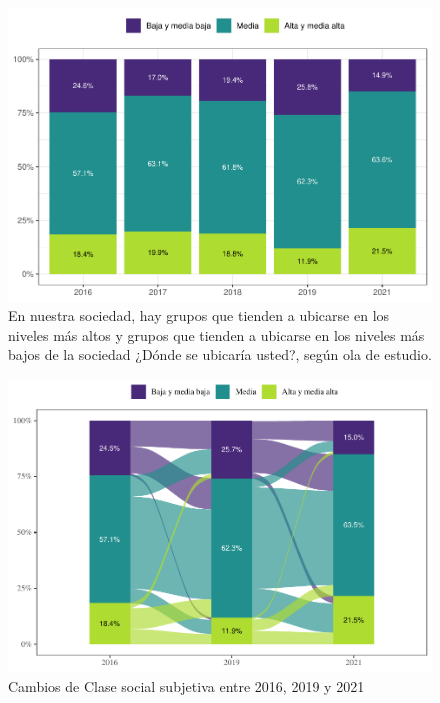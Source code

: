 \documentclass[
  12pt,
]{book}
\begin{document}
\begin{figure}

{\centering \includegraphics{reporte-elsoc_files/figure-latex/ess-ola-1} 

}

\caption{En nuestra sociedad, hay grupos que tienden a ubicarse en los niveles más altos y grupos que tienden a ubicarse en los niveles más bajos de la sociedad ¿Dónde se ubicaría usted?, según ola de estudio.}\label{fig:ess-ola}
\end{figure}

\begin{figure}

{\centering \includegraphics{reporte-elsoc_files/figure-latex/ess-cambio-1} 

}

\caption{Cambios de Clase social subjetiva entre 2016, 2019 y 2021}\label{fig:ess-cambio}
\end{figure}
\end{document}
